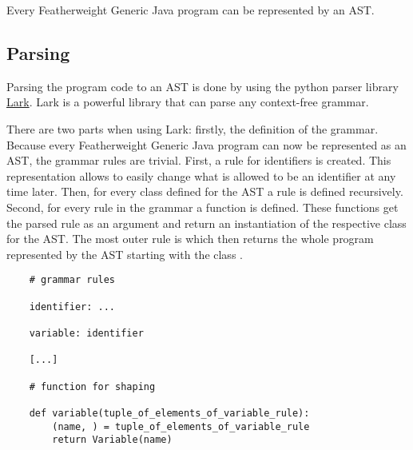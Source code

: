 Every Featherweight Generic Java program can be represented by an AST.

\subsection{Parsing}

Parsing the program code to an AST is done by using the python parser library \href{https://lark-parser.readthedocs.io/en/stable/}{Lark}.
Lark is a powerful library that can parse any context-free grammar.

There are two parts when using Lark:
firstly, the definition of the grammar.
Because every Featherweight Generic Java program can now be represented as an AST, the grammar rules are trivial.
First, a rule for identifiers is created. This representation allows to easily change what is allowed to be an identifier at any time later.
Then, for every class defined for the AST a rule is defined recursively.
Second, for every rule in the grammar a function is defined. These functions get the parsed rule as an argument and return an instantiation of the respective class for the AST.
The most outer rule is  which then returns the whole program represented by the AST starting with the class .

\begin{verbatim}
    # grammar rules

    identifier: ...

    variable: identifier

    [...]

    # function for shaping

    def variable(tuple_of_elements_of_variable_rule):
        (name, ) = tuple_of_elements_of_variable_rule
        return Variable(name)
\end{verbatim}
